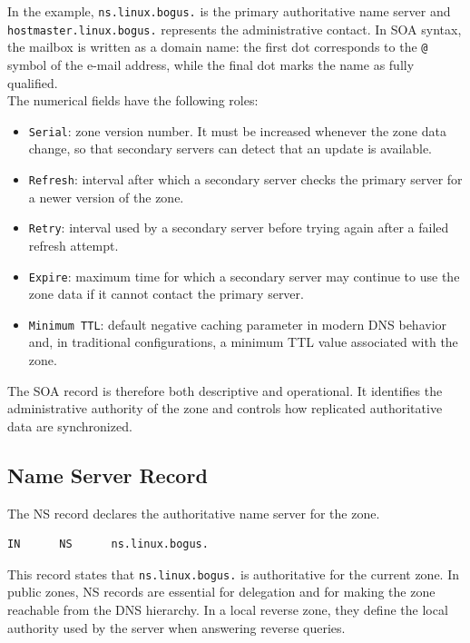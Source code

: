 \documentclass{scrbook}
\begin{document}
	In the example, \texttt{ns.linux.bogus.} is the primary authoritative name server and \texttt{hostmaster.linux.bogus.} represents the administrative contact. In SOA syntax, the mailbox is written as a domain name: the first dot corresponds to the \texttt{@} symbol of the e-mail address, while the final dot marks the name as fully qualified.\\
	
	The numerical fields have the following roles:
	\begin{itemize}
	    \item \texttt{Serial}: zone version number. It must be increased whenever the zone data change, so that secondary servers can detect that an update is available.
	    \item \texttt{Refresh}: interval after which a secondary server checks the primary server for a newer version of the zone.
	    \item \texttt{Retry}: interval used by a secondary server before trying again after a failed refresh attempt.
	    \item \texttt{Expire}: maximum time for which a secondary server may continue to use the zone data if it cannot contact the primary server.
	    \item \texttt{Minimum TTL}: default negative caching parameter in modern DNS behavior and, in traditional configurations, a minimum TTL value associated with the zone.
	\end{itemize}
	
	The SOA record is therefore both descriptive and operational. It identifies the administrative authority of the zone and controls how replicated authoritative data are synchronized.
	
	\subsection{Name Server Record}
	
	The NS record declares the authoritative name server for the zone.
	
	\begin{lstlisting}
IN      NS      ns.linux.bogus.
	\end{lstlisting}
	
	This record states that \texttt{ns.linux.bogus.} is authoritative for the current zone. In public zones, NS records are essential for delegation and for making the zone reachable from the DNS hierarchy. In a local reverse zone, they define the local authority used by the server when answering reverse queries.
	
\end{document}
